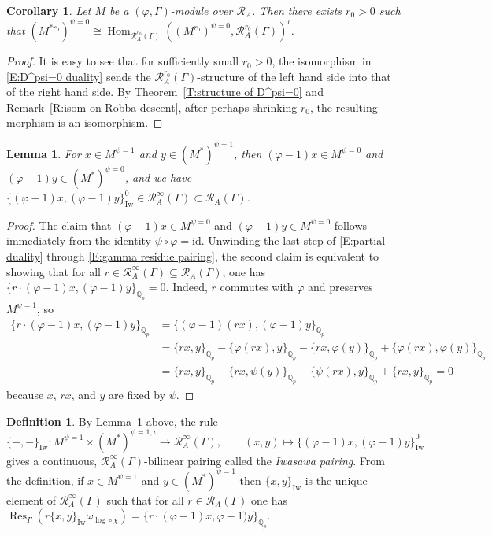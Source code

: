 \documentclass[12pt]{article}
\newtheorem{lemma}[theorem]{Lemma}
\newtheorem{cor}[theorem]{Corollary}
\theoremstyle{definition}
\newtheorem{defn}[theorem]{Definition}
\numberwithin{equation}{theorem}
\newcommand{\calR}{\mathcal{R}}
\newcommand{\QQ}{\mathbb{Q}}
\newcommand{\id}{\mathrm{id}}
\newcommand{\Iw}{\mathrm{Iw}}
\def\Qp{\QQ_p}
\DeclareMathOperator{\Hom}{Hom}
\DeclareMathOperator{\Res}{Res}
\begin{document}
\begin{cor}
\label{C:D^psi=0 duality}
Let $M$ be a $(\varphi, \Gamma)$-module over $\calR_A$.  Then there exists $r_0>0$ such that $(M^{*r_0})^{\psi=0} \cong \Hom_{\calR_A^{r_0}(\Gamma)}((M^{r_0})^{\psi=0}, \calR_A^{r_0}(\Gamma))^\iota$.
\end{cor}
\begin{proof}
It is easy to see that for sufficiently small $r_0>0$, the isomorphism in \eqref{E:D^psi=0 duality} sends the $\calR_A^{r_0}(\Gamma)$-structure of the left hand side into that of the right hand side.  By Theorem~\ref{T:structure of D^psi=0} and Remark~\ref{R:isom on Robba descent}, after perhaps shrinking $r_0$, the resulting morphism is an isomorphism.
\end{proof}

\begin{lemma}\label{L:psi=1 pair to infty}
For $x \in M^{\psi=1}$ and $y \in (M^*)^{\psi=1}$, then $(\varphi-1)x
\in M^{\psi=0}$ and $(\varphi-1)y \in (M^*)^{\psi=0}$, and we have
$\{(\varphi-1)x,(\varphi-1)y\}_\Iw^0 \in \calR_A^\infty(\Gamma)
\subset \calR_A(\Gamma)$.
\end{lemma}
\begin{proof}
The claim that $(\varphi-1)x \in M^{\psi=0}$ and $(\varphi-1)y \in
M^{\psi=0}$ follows immediately from the identity $\psi \circ \varphi
= \id$.  Unwinding the last step of \eqref{E:partial duality} through
\eqref{E:gamma residue pairing}, the second claim is equivalent to
showing that for all $r \in \calR_A^\infty(\Gamma) \subseteq
\calR_A(\Gamma)$, one has $\{r \cdot (\varphi-1)x,(\varphi-1)y\}_{\Qp}
= 0$.  Indeed, $r$ commutes with $\varphi$ and preserves $M^{\psi=1}$,
so
\begin{align*}
\{r \cdot (\varphi-1)x, (\varphi-1)y\}_{\Qp}
&= \{(\varphi-1)(rx), (\varphi-1)y\}_{\Qp} \\
&= \{rx,y\}_{\Qp} - \{\varphi(rx),y\}_{\Qp}
 - \{rx, \varphi(y)\}_{\Qp} + \{\varphi(rx), \varphi(y)\}_{\Qp} \\
&=\{rx,y\}_{\Qp} - \{rx, \psi(y)\}_{\Qp} -\{\psi(rx), y\}_{\Qp} + \{rx,y\}_{\Qp}
 = 0
\end{align*}
because $x$, $rx$, and $y$ are fixed by $\psi$.
\end{proof}

\begin{defn}
\label{D:Iwasawa pairing}
By Lemma~\ref{L:psi=1 pair to infty} above, the rule
\[
\{-,-\}_\Iw:
M^{\psi=1} \times (M^*)^{\psi=1,\iota} \to \calR_A^\infty(\Gamma),
\qquad (x,y) \mapsto \{(\varphi-1)x,(\varphi-1)y\}_\Iw^0
\]
gives a continuous, $\calR_A^\infty(\Gamma)$-bilinear pairing called
the \emph{Iwasawa pairing}.  From the definition, if $x \in
M^{\psi=1}$ and $y \in (M^*)^{\psi=1}$ then $\{x,y\}_\Iw$ is the
unique element of $\calR_A^\infty(\Gamma)$ such that for all $r \in
\calR_A(\Gamma)$ one has
$\Res_\Gamma(r\{x,y\}_\Iw\omega_{\log\circ\chi}) = \{r \cdot
(\varphi-1)x,\varphi-1)y\}_{\Qp}$.
\end{defn}
\end{document}
